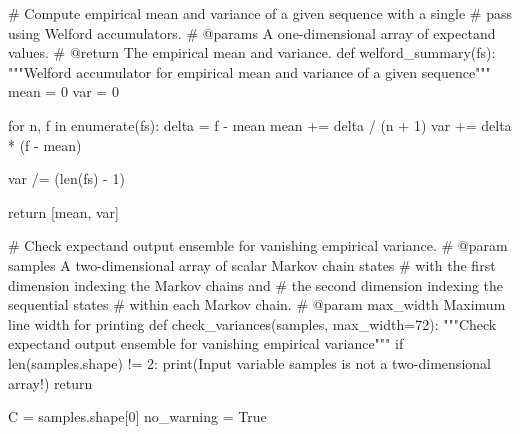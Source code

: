 \documentclass[
  letterpaper,
  DIV=11,
  numbers=noendperiod]{scrartcl}
\newenvironment{Shaded}{\begin{snugshade}}{\end{snugshade}}
\newcommand{\BuiltInTok}[1]{\textcolor[rgb]{0.00,0.23,0.31}{#1}}
\newcommand{\CommentTok}[1]{\textcolor[rgb]{0.37,0.37,0.37}{#1}}
\newcommand{\ControlFlowTok}[1]{\textcolor[rgb]{0.00,0.23,0.31}{#1}}
\newcommand{\DecValTok}[1]{\textcolor[rgb]{0.68,0.00,0.00}{#1}}
\newcommand{\KeywordTok}[1]{\textcolor[rgb]{0.00,0.23,0.31}{#1}}
\newcommand{\NormalTok}[1]{\textcolor[rgb]{0.00,0.23,0.31}{#1}}
\newcommand{\OperatorTok}[1]{\textcolor[rgb]{0.37,0.37,0.37}{#1}}
\newcommand{\StringTok}[1]{\textcolor[rgb]{0.13,0.47,0.30}{#1}}
\newcommand{\VariableTok}[1]{\textcolor[rgb]{0.07,0.07,0.07}{#1}}
\begin{document}
\begin{Shaded}
\begin{Highlighting}[]
\CommentTok{\# Compute empirical mean and variance of a given sequence with a single}
\CommentTok{\# pass using Welford accumulators.}
\CommentTok{\# @params A one{-}dimensional array of expectand values.}
\CommentTok{\# @return The empirical mean and variance.}
\KeywordTok{def}\NormalTok{ welford\_summary(fs):}
  \CommentTok{"""Welford accumulator for empirical mean and variance of a}
\CommentTok{     given sequence"""}
\NormalTok{  mean }\OperatorTok{=} \DecValTok{0}
\NormalTok{  var }\OperatorTok{=} \DecValTok{0}
  
  \ControlFlowTok{for}\NormalTok{ n, f }\KeywordTok{in} \BuiltInTok{enumerate}\NormalTok{(fs):}
\NormalTok{    delta }\OperatorTok{=}\NormalTok{ f }\OperatorTok{{-}}\NormalTok{ mean}
\NormalTok{    mean }\OperatorTok{+=}\NormalTok{ delta }\OperatorTok{/}\NormalTok{ (n }\OperatorTok{+} \DecValTok{1}\NormalTok{)}
\NormalTok{    var }\OperatorTok{+=}\NormalTok{ delta }\OperatorTok{*}\NormalTok{ (f }\OperatorTok{{-}}\NormalTok{ mean)}
    
\NormalTok{  var }\OperatorTok{/=}\NormalTok{ (}\BuiltInTok{len}\NormalTok{(fs) }\OperatorTok{{-}} \DecValTok{1}\NormalTok{)}
  
  \ControlFlowTok{return}\NormalTok{ [mean, var]}

\CommentTok{\# Check expectand output ensemble for vanishing empirical variance.}
\CommentTok{\# @param samples A two{-}dimensional array of scalar Markov chain states }
\CommentTok{\#                with the first dimension indexing the Markov chains and }
\CommentTok{\#                the second dimension indexing the sequential states }
\CommentTok{\#                within each Markov chain.}
\CommentTok{\# @param max\_width Maximum line width for printing}
\KeywordTok{def}\NormalTok{ check\_variances(samples, max\_width}\OperatorTok{=}\DecValTok{72}\NormalTok{):}
  \CommentTok{"""Check expectand output ensemble for vanishing empirical variance"""}
  \ControlFlowTok{if} \BuiltInTok{len}\NormalTok{(samples.shape) }\OperatorTok{!=} \DecValTok{2}\NormalTok{:}
    \BuiltInTok{print}\NormalTok{(}\StringTok{\textquotesingle{}Input variable \textasciigrave{}samples\textasciigrave{} is not a two{-}dimensional array!\textquotesingle{}}\NormalTok{)}
    \ControlFlowTok{return}
  
\NormalTok{  C }\OperatorTok{=}\NormalTok{ samples.shape[}\DecValTok{0}\NormalTok{]}
\NormalTok{  no\_warning }\OperatorTok{=} \VariableTok{True}
  

\end{Highlighting}
\end{Shaded}
\end{document}
